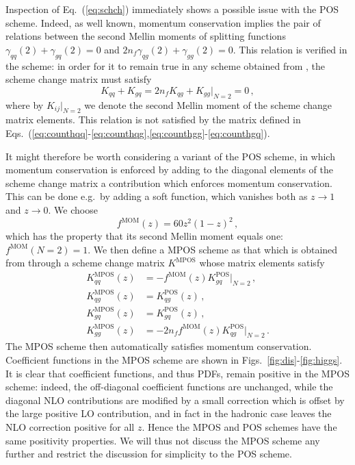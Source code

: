 Inspection of Eq.~(\ref{eq:schch}) immediately shows a possible issue
with the POS scheme. Indeed, as well known, momentum conservation
implies the pair of relations between the second Mellin moments of splitting
functions $\gamma_{qq}(2)+\gamma_{gq}(2)=0$ and
 $2n_f\gamma_{qg}(2)+\gamma_{gg}(2)=0$. This relation is verified in the
\msbar{} scheme:  in order for it to remain true  in any scheme obtained
from \msbar{}, the scheme change matrix must satisfy
\begin{equation}\label{eq:momcons}
  K_{qq}+K_{gq}=2n_fK_{qg}+K_{gg}\Big|_{N=2}=0 \,,
\end{equation}
where by $K_{ij}\Big|_{N=2}$ we denote the second Mellin moment of the
scheme change matrix elements. This relation is not satisfied by the matrix defined in
Eqs.~(\ref{eq:counthqq}-\ref{eq:counthqg},\ref{eq:counthgg}-\ref{eq:counthgq}).

It might therefore be worth considering a variant of the POS scheme,
in which momentum conservation is enforced by adding to the diagonal
elements of the scheme change matrix a contribution which enforces
momentum conservation. This can be done e.g.\ by adding a soft
function, which vanishes both as $z\to1$ and $z \to0$. We choose
\begin{equation}\label{eq:fmom}
  f^{\textrm{MOM}}(z)= 60 z^2(1-z)^2\,,
\end{equation}
which has the property that its second Mellin moment equals one:
$f^{\textrm{MOM}}(N=2)=1$. We then define a MPOS scheme as that which is obtained
from \msbar{} through a scheme change matrix $K^{\textrm{MPOS}}$ whose
matrix elements satisfy
\begin{align}
  \label{eq:mposqq}
  K^{\textrm{MPOS}}_{qq}(z)&= - f^{\textrm{MOM}}(z) K^{\textrm{POS}}_{gq}\Big|_{N=2} \,,\\
  \label{eq:mposqg}
  K^{\textrm{MPOS}}_{qg}(z)&= K^{\textrm{POS}}_{qg}(z) \,,\\
  \label{eq:mposgq}
  K^{\textrm{MPOS}}_{gq}(z)&= K^{\textrm{POS}}_{gq}(z) \,,\\
  \label{eq:mposgg}
  K^{\textrm{MPOS}}_{gg}(z)&= -2n_f f^{\textrm{MOM}}(z) K^{\textrm{POS}}_{qg}\Big|_{N=2} \,.
\end{align}
The MPOS scheme then automatically satisfies momentum
conservation. Coefficient functions in the MPOS scheme are shown in
Figs.~\ref{fig:dis}-\ref{fig:higgs}. It is clear that coefficient
functions, and thus PDFs, remain
positive in the MPOS scheme: indeed, the off-diagonal coefficient
functions are unchanged, while the diagonal NLO contributions are
modified by a small correction which is offset by the large positive
LO contribution, and in fact in the hadronic case leaves the NLO
correction positive for all $z$. Hence the MPOS and POS schemes have the same
positivity properties. We will thus not discuss the MPOS scheme
any further and restrict the discussion for simplicity to the POS
scheme.

